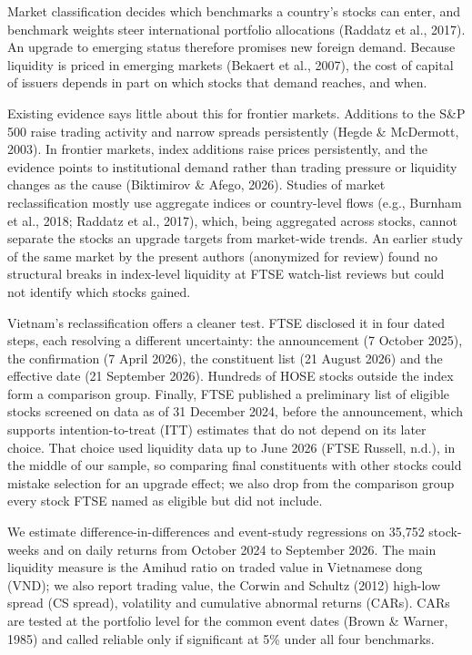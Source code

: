 \documentclass[review,authoryear,12pt]{elsarticle}
\begin{document}
Market classification decides which benchmarks a country's stocks can
enter, and benchmark weights steer international portfolio allocations
(Raddatz et al., 2017). An upgrade to emerging status therefore promises
new foreign demand. Because liquidity is priced in emerging markets
(Bekaert et al., 2007), the cost of capital of issuers depends in part
on which stocks that demand reaches, and when.

Existing evidence says little about this for frontier markets. Additions
to the S\&P 500 raise trading activity and narrow spreads persistently
(Hegde \& McDermott, 2003). In frontier markets, index additions raise
prices persistently, and the evidence points to institutional demand
rather than trading pressure or liquidity changes as the cause
(Biktimirov \& Afego, 2026). Studies of market reclassification mostly
use aggregate indices or country-level flows (e.g., Burnham et al.,
2018; Raddatz et al., 2017), which, being aggregated across stocks,
cannot separate the stocks an upgrade targets from market-wide trends.
An earlier study of the same market by the present authors (anonymized
for review) found no structural breaks in index-level liquidity at FTSE
watch-list reviews but could not identify which stocks gained.

Vietnam's reclassification offers a cleaner test. FTSE disclosed it in
four dated steps, each resolving a different uncertainty: the
announcement (7 October 2025), the confirmation (7 April 2026), the
constituent list (21 August 2026) and the effective date (21 September
2026). Hundreds of HOSE stocks outside the index form a comparison
group. Finally, FTSE published a preliminary list of eligible stocks
screened on data as of 31 December 2024, before the announcement, which
supports intention-to-treat (ITT) estimates that do not depend on its
later choice. That choice used liquidity data up to June 2026 (FTSE
Russell, n.d.), in the middle of our sample, so comparing final
constituents with other stocks could mistake selection for an upgrade
effect; we also drop from the comparison group every stock FTSE named as
eligible but did not include.

We estimate difference-in-differences and event-study regressions on
35,752 stock-weeks and on daily returns from October 2024 to September
2026. The main liquidity measure is the Amihud ratio on traded value in
Vietnamese dong (VND); we also report trading value, the Corwin and
Schultz (2012) high-low spread (CS spread), volatility and cumulative
abnormal returns (CARs). CARs are tested at the portfolio level for the
common event dates (Brown \& Warner, 1985) and called reliable only if
significant at 5\% under all four benchmarks.
\end{document}
